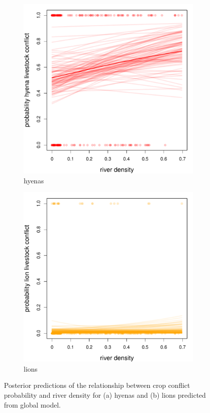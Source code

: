\documentclass[12pt,]{article}
\begin{document}
\begin{figure}
  \centering
	\begin{subfigure}[b]{0.49\textwidth}
	\includegraphics[width=\textwidth]{Figures/river_livestock_global_conflict_hyena.pdf} 
    \caption{hyenas}
   	    \label{fig:cropRIVhyena}
\end{subfigure}
\begin{subfigure}[b]{0.49\textwidth}
	\includegraphics[width=\textwidth]{Figures/river_livestock_global_conflict_lion.pdf}  
    \caption{lions}
  	\label{fig:cropRIVleo}
\end{subfigure}
\caption{Posterior predictions of the relationship between crop conflict probability and river density for (a) hyenas and (b) lions predicted from global model.}
\end{figure}
\end{document}
